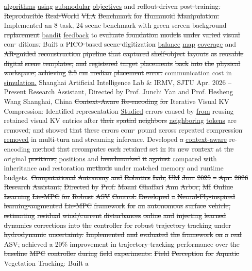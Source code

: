 \documentclass[10pt,letterpaper]{article}
\newcommand{\del}[1]{{\color{red}\sout{#1}}}
\newcommand{\add}[1]{{\color{blue}\uline{#1}}}
\begin{document}
\add{algorithms} \add{using} \add{submodular} \add{objectives} and \del{rollout-driven} \del{post-training.} \del{} \del{Reproducible} \del{Real-World} \del{VLA} \del{Benchmark} \del{for} \del{Humanoid} \del{Manipulation:} \del{Implemented} \del{an} \del{8-task,} \del{24-scene} \del{benchmark} \del{with} \del{green-screen} \del{background} \del{replacement} \add{bandit} \add{feedback} to \del{evaluate} \del{foundation} \del{models} \del{under} \del{varied} \del{visual} \del{con-} \del{ditions.} \del{Built} \del{a} \del{PICO-based} \del{scene-digitization} \add{balance} \add{map} \add{coverage} and \del{AR-guided} \del{reconstruction} \del{pipeline} \del{that} \del{captured} \del{shelf-object} \del{layouts} \del{as} \del{reusable} \del{digital} \del{scene} \del{templates,} \del{and} \del{registered} \del{target} \del{placements} \del{back} \del{into} \del{the} \del{physical} \del{workspace,} \del{achieving} \del{2.5} \del{cm} \del{median} \del{placement} \del{error.} \add{communication} \add{cost} \add{in} \add{simulation.} Shanghai Artificial Intelligence Lab \& IRMV, SJTU Apr. 2026 -- Present Research Assistant, Directed by Prof. Junchi Yan and Prof. Hesheng Wang Shanghai, China  \del{Context-Aware} \del{Re-encoding} \del{for} Iterative Visual KV Compression: \del{Identified} \del{representation} \add{Studied} errors \del{caused} \del{by} \add{from} reusing retained visual KV entries after \del{their} \del{spatial} \del{neighbors} \add{neighboring} \add{tokens} are \del{removed,} \del{and} \del{showed} \del{that} \del{these} \del{errors} \del{com-} \del{pound} \del{across} \del{repeated} \del{compression} \add{removed} in multi-turn and streaming inference. Developed \del{a} \add{context-aware} re-encoding \del{method} \del{that} \del{recomputes} \del{each} \del{retained} \del{set} \del{in} \del{its} \del{new} \del{context} at \del{the} original \del{positions,} \add{positions} and \del{benchmarked} \del{it} \del{against} \add{compared} \add{with} inheritance and restoration \del{methods} under matched memory and runtime budgets. \del{Computational} \del{Autonomy} \del{and} \del{Robotics} \del{Lab,} \del{UM} \del{Jun.} \del{2025} \del{--} \del{Apr.} \del{2026} \del{Research} \del{Assistant,} \del{Directed} \del{by} \del{Prof.} \del{Maani} \del{Ghaffari} \del{Ann} \del{Arbor,} \del{MI} \del{} \del{Online} \del{Learning} \del{Lie-MPC} \del{for} \del{Robust} \del{ASV} \del{Control:} \del{Developed} \del{a} \del{Neural-Fly-inspired} \del{learning-augmented} \del{Lie-MPC} \del{framework} \del{for} \del{an} \del{autonomous} \del{surface} \del{vehicle,} \del{estimating} \del{residual} \del{wind/current} \del{disturbances} \del{online} \del{and} \del{injecting} \del{learned} \del{dynamics} \del{corrections} \del{into} \del{the} \del{controller} \del{for} \del{robust} \del{trajectory} \del{tracking} \del{under} \del{hydrodynamic} \del{uncertainty.} \del{Implemented} \del{and} \del{evaluated} \del{the} \del{framework} \del{on} \del{a} \del{real} \del{ASV,} \del{achieved} \del{a} \del{20\%} \del{improvement} \del{in} \del{trajectory-tracking} \del{performance} \del{over} \del{the} \del{baseline} \del{MPC} \del{controller} \del{during} \del{field} \del{experiments.} \del{} \del{Field} \del{Perception} \del{for} \del{Aquatic} \del{Vegetation} \del{Tracking:} \del{Built} \del{a} 
\end{document}
